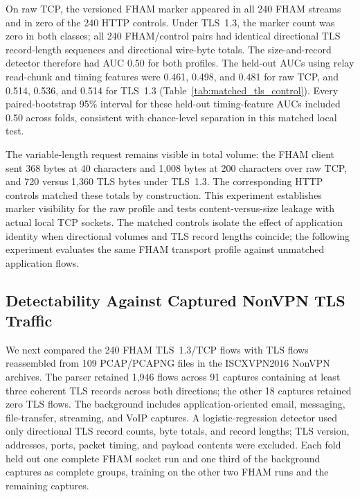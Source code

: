 \documentclass[preprint,12pt]{elsarticle}
\theoremstyle{plain}
\providecommand{\DIFaddtex}[1]{{\protect\color{blue} \sf #1}} %
\providecommand{\DIFdeltex}[1]{{\protect\color{red} \scriptsize #1}} %
\providecommand{\DIFaddbegin}{} %
\providecommand{\DIFaddend}{} %
\providecommand{\DIFdelbegin}{} %
\providecommand{\DIFdelend}{} %
\providecommand{\DIFadd}[1]{\texorpdfstring{\DIFaddtex{#1}}{#1}} %
\providecommand{\DIFdel}[1]{\texorpdfstring{\DIFdeltex{#1}}{}} %
\providecommand{\DIFscaledelfig}{0.5}
\newlength{\DIFdelgraphicswidth} %
\newlength{\DIFdelgraphicsheight} %
\providecommand{\DIFaddincludegraphics}[2][]{{\color{blue}\fbox{\DIFOincludegraphics[#1]{#2}}}} %
\providecommand{\DIFdelincludegraphics}[2][]{%
\sbox{\DIFdelgraphicsbox}{\DIFOincludegraphics[#1]{#2}}%
\settoboxwidth{\DIFdelgraphicswidth}{\DIFdelgraphicsbox} %
\settoboxtotalheight{\DIFdelgraphicsheight}{\DIFdelgraphicsbox} %
\scalebox{\DIFscaledelfig}{%
\parbox[b]{\DIFdelgraphicswidth}{\usebox{\DIFdelgraphicsbox}\\[-\baselineskip] \rule{\DIFdelgraphicswidth}{0em}}\llap{\resizebox{\DIFdelgraphicswidth}{\DIFdelgraphicsheight}{%
\setlength{\unitlength}{\DIFdelgraphicswidth}%
\begin{picture}(1,1)%
\thicklines\linethickness{2pt} %
{\color[rgb]{1,0,0}\put(0,0){\framebox(1,1){}}}%
{\color[rgb]{1,0,0}\put(0,0){\line( 1,1){1}}}%
{\color[rgb]{1,0,0}\put(0,1){\line(1,-1){1}}}%
\end{picture}%
}\hspace*{3pt}}} %
} %
\DeclareRobustCommand{\DIFaddbegin}{\DIFOaddbegin \let\includegraphics\DIFaddincludegraphics} %
\DeclareRobustCommand{\DIFaddend}{\DIFOaddend \let\includegraphics\DIFOincludegraphics} %
\DeclareRobustCommand{\DIFdelbegin}{\DIFOdelbegin \let\includegraphics\DIFdelincludegraphics} %
\DeclareRobustCommand{\DIFdelend}{\DIFOaddend \let\includegraphics\DIFOincludegraphics} %
\renewcommand{\DIFdel}[1]{}
\renewcommand{\DIFdelincludegraphics}[2][]{}
\begin{document}
On raw TCP, the versioned FHAM marker appeared in all 240 FHAM streams and in
\DIFdelbegin \DIFdel{none }\DIFdelend \DIFaddbegin \DIFadd{zero }\DIFaddend of the 240 HTTP controls. Under TLS~1.3, \DIFdelbegin \DIFdel{it appeared in neither class}\DIFdelend \DIFaddbegin \DIFadd{the marker count was zero in both classes}\DIFaddend ;
all 240 FHAM/control pairs had identical directional TLS record-length
sequences and directional wire-byte totals. The size-and-record detector
therefore had AUC 0.50 for both profiles. The held-out AUCs using relay
read-chunk and timing features were 0.461, 0.498, and 0.481 for raw TCP, and
0.514, 0.536, and 0.514 for TLS~1.3 (Table~\ref{tab:matched_tls_control}).
Every paired-bootstrap 95\% interval for these held-out timing-feature AUCs
included 0.50 \DIFdelbegin \DIFdel{, so the detector did not show stable above-chance }\DIFdelend \DIFaddbegin \DIFadd{across folds, consistent with chance-level }\DIFaddend separation in
this matched local test.

The variable-length request remains visible in total volume: the FHAM client
sent 368 bytes at 40 characters and 1,008 bytes at 200 characters over raw
TCP, and 720 versus 1,360 TLS bytes under TLS~1.3. The corresponding HTTP
controls matched these totals by construction. This experiment establishes
marker visibility for the raw profile and tests content-versus-size leakage
with actual local TCP sockets. The matched controls isolate the effect of
application identity when directional volumes and TLS record lengths coincide;
the following experiment evaluates the same FHAM transport profile against
unmatched application flows.

\begin{table}[H]
\centering
\scriptsize
\setlength{\tabcolsep}{3pt}
\caption{Socket-level FHAM marker and held-out detectability results with matched HTTP controls.}
\label{tab:matched_tls_control}

\end{table}

\subsection{Detectability Against Captured NonVPN TLS Traffic}

We next compared the 240 FHAM TLS~1.3/TCP flows with TLS flows reassembled from
109 PCAP/PCAPNG files in the ISCXVPN2016 NonVPN archives. The parser retained
1,946 flows across 91 captures containing at least three coherent TLS records
across both directions; the other 18 captures \DIFdelbegin \DIFdel{supplied no retained TLS flow}\DIFdelend \DIFaddbegin \DIFadd{retained zero TLS flows}\DIFaddend .
The background includes application-oriented email, messaging, file-transfer,
streaming, and VoIP captures. A logistic-regression detector used only
directional TLS record counts, byte totals, and record lengths; TLS version,
addresses, ports, packet timing, and payload contents were excluded. Each fold
held out one complete FHAM socket run and one third of the background captures as
complete groups, training on the other two FHAM runs and the remaining
captures.
\end{document}

